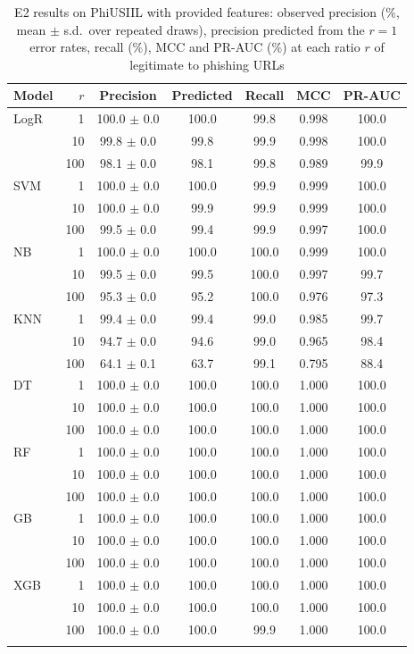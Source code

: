 \documentclass[pdflatex,sn-mathphys-num]{sn-jnl}%
\theoremstyle{thmstyleone}%
\theoremstyle{thmstyletwo}%
\theoremstyle{thmstylethree}%
\begin{document}
\begin{table}[htbp]
\caption{E2 results on PhiUSIIL with provided features: observed precision (\%, mean $\pm$ s.d.\ over repeated draws), precision predicted from the $r=1$ error rates, recall (\%), MCC and PR-AUC (\%) at each ratio $r$ of legitimate to phishing URLs}\label{tab:e2-provided}%
\begin{tabular}{@{}lrccccc@{}}
\toprule
Model & $r$ & Precision & Predicted & Recall & MCC & PR-AUC \\
\midrule
LogR & 1 & 100.0 $\pm$ 0.0 & 100.0 & 99.8 & 0.998 & 100.0 \\
 & 10 & 99.8 $\pm$ 0.0 & 99.8 & 99.9 & 0.998 & 100.0 \\
 & 100 & 98.1 $\pm$ 0.0 & 98.1 & 99.8 & 0.989 & 99.9 \\
SVM & 1 & 100.0 $\pm$ 0.0 & 100.0 & 99.9 & 0.999 & 100.0 \\
 & 10 & 100.0 $\pm$ 0.0 & 99.9 & 99.9 & 0.999 & 100.0 \\
 & 100 & 99.5 $\pm$ 0.0 & 99.4 & 99.9 & 0.997 & 100.0 \\
NB & 1 & 100.0 $\pm$ 0.0 & 100.0 & 100.0 & 0.999 & 100.0 \\
 & 10 & 99.5 $\pm$ 0.0 & 99.5 & 100.0 & 0.997 & 99.7 \\
 & 100 & 95.3 $\pm$ 0.0 & 95.2 & 100.0 & 0.976 & 97.3 \\
KNN & 1 & 99.4 $\pm$ 0.0 & 99.4 & 99.0 & 0.985 & 99.7 \\
 & 10 & 94.7 $\pm$ 0.0 & 94.6 & 99.0 & 0.965 & 98.4 \\
 & 100 & 64.1 $\pm$ 0.1 & 63.7 & 99.1 & 0.795 & 88.4 \\
DT & 1 & 100.0 $\pm$ 0.0 & 100.0 & 100.0 & 1.000 & 100.0 \\
 & 10 & 100.0 $\pm$ 0.0 & 100.0 & 100.0 & 1.000 & 100.0 \\
 & 100 & 100.0 $\pm$ 0.0 & 100.0 & 100.0 & 1.000 & 100.0 \\
RF & 1 & 100.0 $\pm$ 0.0 & 100.0 & 100.0 & 1.000 & 100.0 \\
 & 10 & 100.0 $\pm$ 0.0 & 100.0 & 100.0 & 1.000 & 100.0 \\
 & 100 & 100.0 $\pm$ 0.0 & 100.0 & 100.0 & 1.000 & 100.0 \\
GB & 1 & 100.0 $\pm$ 0.0 & 100.0 & 100.0 & 1.000 & 100.0 \\
 & 10 & 100.0 $\pm$ 0.0 & 100.0 & 100.0 & 1.000 & 100.0 \\
 & 100 & 100.0 $\pm$ 0.0 & 100.0 & 100.0 & 1.000 & 100.0 \\
XGB & 1 & 100.0 $\pm$ 0.0 & 100.0 & 100.0 & 1.000 & 100.0 \\
 & 10 & 100.0 $\pm$ 0.0 & 100.0 & 100.0 & 1.000 & 100.0 \\
 & 100 & 100.0 $\pm$ 0.0 & 100.0 & 99.9 & 1.000 & 100.0 \\
\botrule
\end{tabular}
\end{table}
\end{document}
